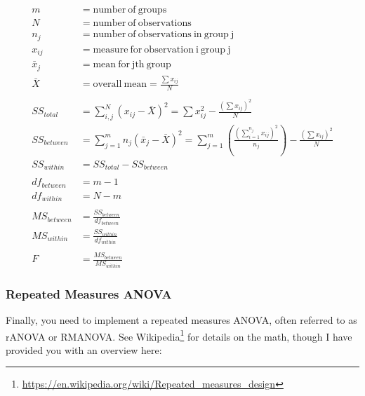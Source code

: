 \documentclass[11pt]{article}
\begin{document}
\begin{align*}
    m &= \mathrm{number~of~groups} \\
    N &= \mathrm{number~of~observations} \\
    n_j &= \mathrm{number~of~observations~in~group~j} \\
    x_{ij} &= \mathrm{measure~for~observation~i~group~j} \\
    \bar{x}_j &= \mathrm{mean~for~jth~group} \\
    \bar{X} &= \mathrm{overall~mean} = \frac{\sum x_{ij}}{N} \\
    ~&\\
    SS_{total} &= \sum_{i,j}^{N} (x_{ij} - \bar{X})^2 = \sum x_{ij}^2 - \frac{(\sum x_{ij})^2}{N}\\
    SS_{between} &= \sum_{j=1}^m n_j \left(\bar{x}_j - \bar{X}\right)^2 = \sum_{j=1}^m \left( \frac{(\sum_{i=1}^{n_j} x_{ij})^2}{n_j} \right) - \frac{(\sum x_{ij})^2}{N} \\
    SS_{within} &=  SS_{total} - SS_{between} \\
    ~&\\
    df_{between} &= m-1 \\
    df_{within} &= N-m \\
    ~&\\
    MS_{between} &= \frac{SS_{between}}{df_{between}} \\
    MS_{within} &= \frac{SS_{within}}{df_{within}} \\
    ~&\\
    F &= \frac{MS_{between}}{MS_{within}}
\end{align*}

\subsubsection*{Repeated Measures ANOVA}
Finally, you need to implement a repeated measures ANOVA, often referred to as rANOVA or RMANOVA.  See Wikipedia\footnote{\url{https://en.wikipedia.org/wiki/Repeated_measures_design}} for details on the math, though I have provided you with an overview here:
\end{document}
